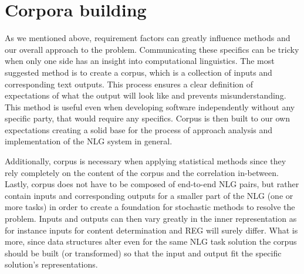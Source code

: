 \section{Corpora building}
As we mentioned above, requirement factors can greatly influence methods and our overall approach to the problem. Communicating these specifics can be tricky when only one side has an insight into computational linguistics. The most suggested method is to create a corpus, which is a collection of inputs and corresponding text outputs. This process ensures a clear definition of expectations of what the output will look like and prevents misunderstanding. This method is useful even when developing software independently without any specific party, that would require any specifics. Corpus is then built to our own expectations creating a solid base for the process of approach analysis and implementation of the NLG system in general. 

Additionally, corpus is necessary when applying statistical methods since they rely completely on the content of the corpus and the correlation in-between. Lastly, corpus does not have to be composed of end-to-end NLG pairs, but rather contain inputs and corresponding outputs for a smaller part of the NLG (one or more tasks) in order to create a foundation for stochastic methods to resolve the problem. Inputs and outputs can then vary greatly in the inner representation as for instance inputs for content determination and REG will surely differ. What is more, since data structures  alter even for the same NLG task solution the corpus should be built (or transformed) so that the input and output fit the specific solution's representations.

